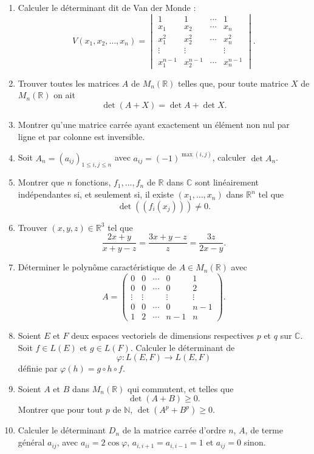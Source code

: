 \begin{enumerate}[label=\arabic*.,leftmargin=2.2em,itemsep=1.1em]
\item Calculer le déterminant dit de Van der Monde :
\[
V(x_1,x_2,\ldots,x_n)=
\begin{vmatrix}
1&1&\cdots&1\\
x_1&x_2&\cdots&x_n\\
x_1^2&x_2^2&\cdots&x_n^2\\
\vdots&\vdots&&\vdots\\
x_1^{n-1}&x_2^{n-1}&\cdots&x_n^{n-1}
\end{vmatrix}.
\]

\item Trouver toutes les matrices $A$ de $M_n(\mathbb R)$ telles que, pour toute matrice $X$ de $M_n(\mathbb R)$ on ait
\[
\det(A+X)=\det A+\det X.
\]

\item Montrer qu'une matrice carrée ayant exactement un élément non nul par ligne et par colonne est inversible.

\item Soit $A_n=(a_{ij})_{1\le i,j\le n}$ avec $a_{ij}=(-1)^{\max(i,j)}$, calculer $\det A_n$.

\item Montrer que $n$ fonctions, $f_1,\ldots,f_n$ de $\mathbb R$ dans $\mathbb C$ sont linéairement indépendantes si, et seulement si, il existe $(x_1,\ldots,x_n)$ dans $\mathbb R^n$ tel que
\[
\det((f_i(x_j)))\ne0.
\]

\item Trouver $(x,y,z)\in\mathbb R^3$ tel que
\[
\frac{2x+y}{x+y-z}=\frac{3x+y-z}{z}=\frac{3z}{2x-y}.
\]

\item Déterminer le polynôme caractéristique de $A\in M_n(\mathbb R)$ avec
\[
A=\begin{pmatrix}
0&0&\cdots&0&1\\
0&0&\cdots&0&2\\
\vdots&\vdots&&\vdots&\vdots\\
0&0&\cdots&0&n-1\\
1&2&\cdots&n-1&n
\end{pmatrix}.
\]

\item Soient $E$ et $F$ deux espaces vectoriels de dimensions respectives $p$ et $q$ sur $\mathbb C$. Soit $f\in L(E)$ et $g\in L(F)$. Calculer le déterminant de
\[
\varphi:L(E,F)\longrightarrow L(E,F)
\]
définie par $\varphi(h)=g\circ h\circ f$.

\item Soient $A$ et $B$ dans $M_n(\mathbb R)$ qui commutent, et telles que
\[
\det(A+B)\ge0.
\]
Montrer que pour tout $p$ de $\mathbb N$, $\det(A^p+B^p)\ge0$.

\item Calculer le déterminant $D_n$ de la matrice carrée d'ordre $n$, $A$, de terme général $a_{ij}$, avec $a_{ii}=2\cos\varphi$, $a_{i,i+1}=a_{i,i-1}=1$ et $a_{ij}=0$ sinon.

\end{enumerate}

